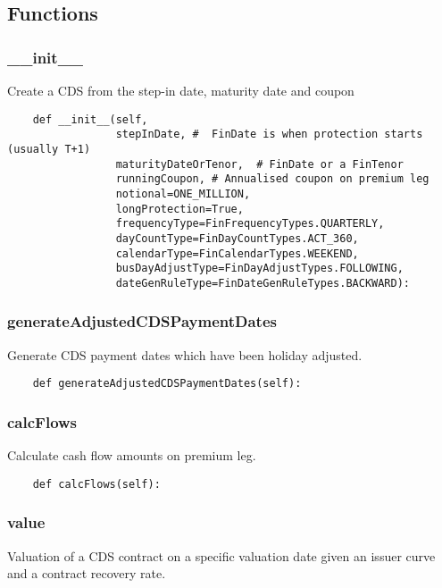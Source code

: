 \documentclass[twoside,11pt]{book}
\begin{document}
\subsection*{Functions}

\subsubsection*{{\bf \_\_init\_\_}}
Create a CDS from the step-in date, maturity date and coupon  

\begin{lstlisting}
    def __init__(self,
                 stepInDate, #  FinDate is when protection starts (usually T+1)
                 maturityDateOrTenor,  # FinDate or a FinTenor
                 runningCoupon, # Annualised coupon on premium leg
                 notional=ONE_MILLION,
                 longProtection=True,
                 frequencyType=FinFrequencyTypes.QUARTERLY,
                 dayCountType=FinDayCountTypes.ACT_360,
                 calendarType=FinCalendarTypes.WEEKEND,
                 busDayAdjustType=FinDayAdjustTypes.FOLLOWING,
                 dateGenRuleType=FinDateGenRuleTypes.BACKWARD):
\end{lstlisting}

\subsubsection*{{\bf generateAdjustedCDSPaymentDates}}
Generate CDS payment dates which have been holiday adjusted. 

\begin{lstlisting}
    def generateAdjustedCDSPaymentDates(self):
\end{lstlisting}

\subsubsection*{{\bf calcFlows}}
Calculate cash flow amounts on premium leg.  

\begin{lstlisting}
    def calcFlows(self):
\end{lstlisting}

\subsubsection*{{\bf value}}
Valuation of a CDS contract on a specific valuation date given an issuer curve and a contract recovery rate. 
\end{document}
